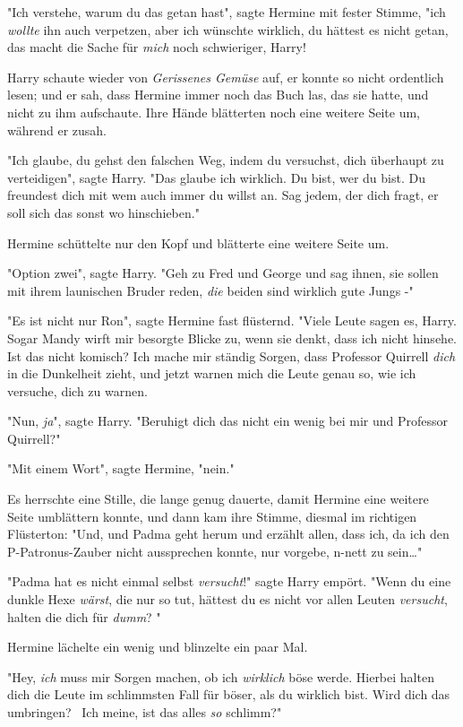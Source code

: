 {"Ich verstehe, warum du das getan hast", sagte Hermine mit fester Stimme, "ich \emph{wollte} ihn auch verpetzen, aber ich wünschte wirklich, du hättest es nicht getan, das macht die Sache für \emph{mich} noch schwieriger, Harry!

Harry schaute wieder von \emph{Gerissenes Gemüse} auf, er konnte so nicht ordentlich lesen; und er sah, dass Hermine immer noch das Buch las, das sie hatte, und nicht zu ihm aufschaute. Ihre Hände blätterten noch eine weitere Seite um, während er zusah.

"Ich glaube, du gehst den falschen Weg, indem du versuchst, dich überhaupt zu verteidigen", sagte Harry. "Das glaube ich wirklich. Du bist, wer du bist. Du freundest dich mit wem auch immer du willst an. Sag jedem, der dich fragt, er soll sich das sonst wo hinschieben."

Hermine schüttelte nur den Kopf und blätterte eine weitere Seite um.

"Option zwei", sagte Harry. "Geh zu Fred und George und sag ihnen, sie sollen mit ihrem launischen Bruder reden, \emph{die} beiden sind wirklich gute Jungs -"

"Es ist nicht nur Ron", sagte Hermine fast flüsternd. "Viele Leute sagen es, Harry. Sogar Mandy wirft mir besorgte Blicke zu, wenn sie denkt, dass ich nicht hinsehe. Ist das nicht komisch? Ich mache mir ständig Sorgen, dass Professor Quirrell \emph{dich} in die Dunkelheit zieht, und jetzt warnen mich die Leute genau so, wie ich versuche, dich zu warnen.

"Nun, \emph{ja}", sagte Harry. "Beruhigt dich das nicht ein wenig bei mir und Professor Quirrell?"

"Mit einem Wort", sagte Hermine, "nein."

Es herrschte eine Stille, die lange genug dauerte, damit Hermine eine weitere Seite umblättern konnte, und dann kam ihre Stimme, diesmal im richtigen Flüsterton: "Und, und Padma geht herum und erzählt allen, dass ich, da ich den P-Patronus-Zauber nicht aussprechen konnte, nur vorgebe, n-nett zu sein…"

"Padma hat es nicht einmal selbst \emph{versucht}!" sagte Harry empört. "Wenn du eine dunkle Hexe \emph{wärst}, die nur so tut, hättest du es nicht vor allen Leuten \emph{versucht}, halten die dich für \emph{dumm}? "

Hermine lächelte ein wenig und blinzelte ein paar Mal.

"Hey, \emph{ich} muss mir Sorgen machen, ob ich \emph{wirklich} böse werde. Hierbei halten dich die Leute im schlimmsten Fall für böser, als du wirklich bist. Wird dich das umbringen? ~Ich meine, ist das alles \emph{so} schlimm?"

}
